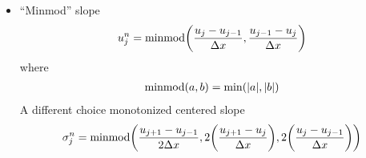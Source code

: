 \documentclass{article}
\newcommand{\Dx}{\Delta x}
\begin{document}
\begin{itemize}
            \item ``Minmod'' slope
            \begin{align*}
                u_j^n = \text{minmod}\qty(\frac{u_j - u_{j-1}}{\Dx},\frac{u_{j-1} - u_j}{\Dx})
            \end{align*}
            where
            \begin{align*}
                \text{minmod}(a,b) = \min(\abs{a},\abs{b})
            \end{align*}
            A different choice monotonized centered slope
            \begin{align*}
                \sigma_j^n = \text{minmod}\qty(\frac{u_{j+1}-u_{j-1}}{2\Dx},2\qty(\frac{u_{j+1} - u_j}{\Dx}),2\qty(\frac{u_j - u_{j-1}}{\Dx}))
            \end{align*}
        \end{itemize}
\end{document}
